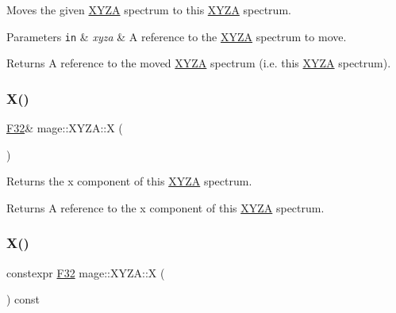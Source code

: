 Moves the given \mbox{\hyperlink{structmage_1_1_x_y_z_a}{X\+Y\+ZA}} spectrum to this \mbox{\hyperlink{structmage_1_1_x_y_z_a}{X\+Y\+ZA}} spectrum.


\begin{DoxyParams}[1]{Parameters}
\mbox{\tt in}  & {\em xyza} & A reference to the \mbox{\hyperlink{structmage_1_1_x_y_z_a}{X\+Y\+ZA}} spectrum to move. \\
\hline
\end{DoxyParams}
\begin{DoxyReturn}{Returns}
A reference to the moved \mbox{\hyperlink{structmage_1_1_x_y_z_a}{X\+Y\+ZA}} spectrum (i.\+e. this \mbox{\hyperlink{structmage_1_1_x_y_z_a}{X\+Y\+ZA}} spectrum). 
\end{DoxyReturn}
\mbox{\label{structmage_1_1_x_y_z_a_a731e38b4d342c92c0652b8e08f396785}} 
\subsubsection{\texorpdfstring{X()}{X()}\hspace{0.1cm}{\footnotesize\ttfamily [1/2]}}
{\footnotesize\ttfamily \mbox{\hyperlink{namespacemage_aa97e833b45f06d60a0a9c4fc22ae02c0}{F32}}\& mage\+::\+X\+Y\+Z\+A\+::X (\begin{DoxyParamCaption}{ }\end{DoxyParamCaption})\hspace{0.3cm}{\ttfamily [noexcept]}}

Returns the x component of this \mbox{\hyperlink{structmage_1_1_x_y_z_a}{X\+Y\+ZA}} spectrum.

\begin{DoxyReturn}{Returns}
A reference to the x component of this \mbox{\hyperlink{structmage_1_1_x_y_z_a}{X\+Y\+ZA}} spectrum. 
\end{DoxyReturn}
\mbox{\label{structmage_1_1_x_y_z_a_a45b6cd64ef541319bf0d09d5574f4399}} 
\subsubsection{\texorpdfstring{X()}{X()}\hspace{0.1cm}{\footnotesize\ttfamily [2/2]}}
{\footnotesize\ttfamily constexpr \mbox{\hyperlink{namespacemage_aa97e833b45f06d60a0a9c4fc22ae02c0}{F32}} mage\+::\+X\+Y\+Z\+A\+::X (\begin{DoxyParamCaption}{ }\end{DoxyParamCaption}) const\hspace{0.3cm}{\ttfamily [noexcept]}}

